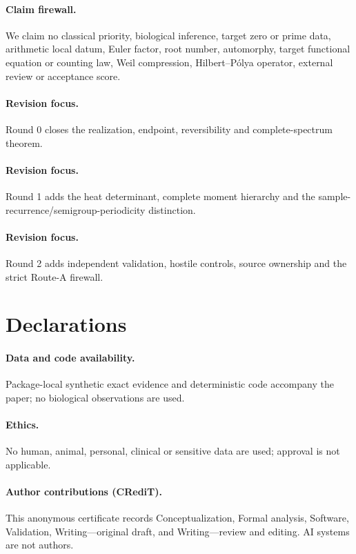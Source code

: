 \documentclass[9pt]{extarticle}
\begin{document}
\paragraph{Claim firewall.}
We claim no classical priority, biological inference, target zero or prime
data, arithmetic local datum, Euler factor, root number, automorphy, target
functional equation or counting law, Weil compression, Hilbert--P\'olya
operator, external review or acceptance score.
\fi

\ifcase\CRevisionRound
\paragraph{Revision focus.} Round 0 closes the realization, endpoint,
reversibility and complete-spectrum theorem.
\or
\paragraph{Revision focus.} Round 1 adds the heat determinant, complete
moment hierarchy and the sample-recurrence/semigroup-periodicity distinction.
\or
\paragraph{Revision focus.} Round 2 adds independent validation, hostile
controls, source ownership and the strict Route-A firewall.
\fi

\section*{Declarations}
\paragraph{Data and code availability.} Package-local synthetic exact evidence
and deterministic code accompany the paper; no biological observations are
used.
\paragraph{Ethics.} No human, animal, personal, clinical or sensitive data are
used; approval is not applicable.
\paragraph{Author contributions (CRediT).} This anonymous certificate records
Conceptualization, Formal analysis, Software, Validation, Writing---original
draft, and Writing---review and editing.  AI systems are not authors.
\end{document}
